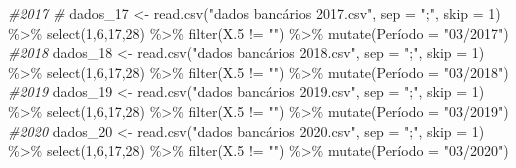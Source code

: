 \documentclass[
]{article}
\newenvironment{Shaded}{\begin{snugshade}}{\end{snugshade}}
\newcommand{\AttributeTok}[1]{\textcolor[rgb]{0.77,0.63,0.00}{#1}}
\newcommand{\CommentTok}[1]{\textcolor[rgb]{0.56,0.35,0.01}{\textit{#1}}}
\newcommand{\DecValTok}[1]{\textcolor[rgb]{0.00,0.00,0.81}{#1}}
\newcommand{\FloatTok}[1]{\textcolor[rgb]{0.00,0.00,0.81}{#1}}
\newcommand{\FunctionTok}[1]{\textcolor[rgb]{0.00,0.00,0.00}{#1}}
\newcommand{\NormalTok}[1]{#1}
\newcommand{\OtherTok}[1]{\textcolor[rgb]{0.56,0.35,0.01}{#1}}
\newcommand{\SpecialCharTok}[1]{\textcolor[rgb]{0.00,0.00,0.00}{#1}}
\newcommand{\StringTok}[1]{\textcolor[rgb]{0.31,0.60,0.02}{#1}}
\begin{document}
\begin{Shaded}
\begin{Highlighting}[]
\CommentTok{\#2017 \# }
\NormalTok{dados\_17 }\OtherTok{\textless{}{-}} \FunctionTok{read.csv}\NormalTok{(}\StringTok{"dados bancários 2017.csv"}\NormalTok{, }\AttributeTok{sep =} \StringTok{";"}\NormalTok{, }\AttributeTok{skip =} \DecValTok{1}\NormalTok{) }\SpecialCharTok{\%\textgreater{}\%} 
  \FunctionTok{select}\NormalTok{(}\DecValTok{1}\NormalTok{,}\DecValTok{6}\NormalTok{,}\DecValTok{17}\NormalTok{,}\DecValTok{28}\NormalTok{) }\SpecialCharTok{\%\textgreater{}\%} \FunctionTok{filter}\NormalTok{(X}\FloatTok{.5} \SpecialCharTok{!=} \StringTok{""}\NormalTok{) }\SpecialCharTok{\%\textgreater{}\%} \FunctionTok{mutate}\NormalTok{(Período }\OtherTok{=} \StringTok{"03/2017"}\NormalTok{) }
\CommentTok{\#2018}
\NormalTok{dados\_18 }\OtherTok{\textless{}{-}} \FunctionTok{read.csv}\NormalTok{(}\StringTok{"dados bancários 2018.csv"}\NormalTok{, }\AttributeTok{sep =} \StringTok{";"}\NormalTok{, }\AttributeTok{skip =} \DecValTok{1}\NormalTok{) }\SpecialCharTok{\%\textgreater{}\%} 
  \FunctionTok{select}\NormalTok{(}\DecValTok{1}\NormalTok{,}\DecValTok{6}\NormalTok{,}\DecValTok{17}\NormalTok{,}\DecValTok{28}\NormalTok{) }\SpecialCharTok{\%\textgreater{}\%} \FunctionTok{filter}\NormalTok{(X}\FloatTok{.5} \SpecialCharTok{!=} \StringTok{""}\NormalTok{) }\SpecialCharTok{\%\textgreater{}\%} \FunctionTok{mutate}\NormalTok{(Período }\OtherTok{=} \StringTok{"03/2018"}\NormalTok{)}
\CommentTok{\#2019}
\NormalTok{dados\_19 }\OtherTok{\textless{}{-}} \FunctionTok{read.csv}\NormalTok{(}\StringTok{"dados bancários 2019.csv"}\NormalTok{, }\AttributeTok{sep =} \StringTok{";"}\NormalTok{, }\AttributeTok{skip =} \DecValTok{1}\NormalTok{) }\SpecialCharTok{\%\textgreater{}\%} 
  \FunctionTok{select}\NormalTok{(}\DecValTok{1}\NormalTok{,}\DecValTok{6}\NormalTok{,}\DecValTok{17}\NormalTok{,}\DecValTok{28}\NormalTok{) }\SpecialCharTok{\%\textgreater{}\%} \FunctionTok{filter}\NormalTok{(X}\FloatTok{.5} \SpecialCharTok{!=} \StringTok{""}\NormalTok{) }\SpecialCharTok{\%\textgreater{}\%} \FunctionTok{mutate}\NormalTok{(Período }\OtherTok{=} \StringTok{"03/2019"}\NormalTok{)}
\CommentTok{\#2020}
\NormalTok{dados\_20 }\OtherTok{\textless{}{-}} \FunctionTok{read.csv}\NormalTok{(}\StringTok{"dados bancários 2020.csv"}\NormalTok{, }\AttributeTok{sep =} \StringTok{";"}\NormalTok{, }\AttributeTok{skip =} \DecValTok{1}\NormalTok{) }\SpecialCharTok{\%\textgreater{}\%} 
  \FunctionTok{select}\NormalTok{(}\DecValTok{1}\NormalTok{,}\DecValTok{6}\NormalTok{,}\DecValTok{17}\NormalTok{,}\DecValTok{28}\NormalTok{) }\SpecialCharTok{\%\textgreater{}\%} \FunctionTok{filter}\NormalTok{(X}\FloatTok{.5} \SpecialCharTok{!=} \StringTok{""}\NormalTok{) }\SpecialCharTok{\%\textgreater{}\%} \FunctionTok{mutate}\NormalTok{(Período }\OtherTok{=} \StringTok{"03/2020"}\NormalTok{)}

\end{Highlighting}
\end{Shaded}
\end{document}

